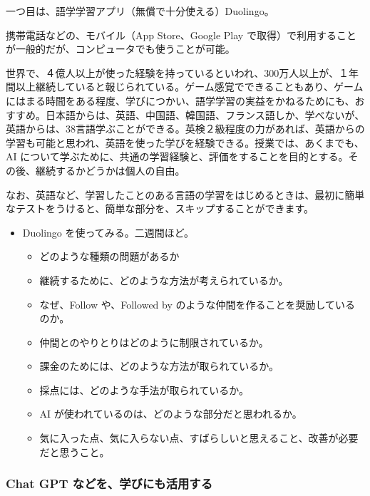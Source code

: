 \documentclass[
]{bxjsbook}
\providecommand{\tightlist}{%
  \setlength{\itemsep}{0pt}\setlength{\parskip}{0pt}}
\theoremstyle{definition}
\theoremstyle{definition}
\theoremstyle{definition}
\theoremstyle{definition}
\theoremstyle{remark}
\begin{document}
一つ目は、語学学習アプリ（無償で十分使える）Duolingo。

携帯電話などの、モバイル（App Store、Google Play で取得）で利用することが一般的だが、コンピュータでも使うことが可能。

世界で、４億人以上が使った経験を持っているといわれ、300万人以上が、１年間以上継続していると報じられている。ゲーム感覚でできることもあり、ゲームにはまる時間をある程度、学びにつかい、語学学習の実益をかねるためにも、おすすめ。日本語からは、英語、中国語、韓国語、フランス語しか、学べないが、英語からは、38言語学ぶことができる。英検２級程度の力があれば、英語からの学習も可能と思われ、英語を使った学びを経験できる。授業では、あくまでも、AI について学ぶために、共通の学習経験と、評価をすることを目的とする。その後、継続するかどうかは個人の自由。

なお、英語など、学習したことのある言語の学習をはじめるときは、最初に簡単なテストをうけると、簡単な部分を、スキップすることができます。

\begin{itemize}
\tightlist
\item
  Duolingo を使ってみる。二週間ほど。

  \begin{itemize}
  \tightlist
  \item
    どのような種類の問題があるか
  \item
    継続するために、どのような方法が考えられているか。
  \item
    なぜ、Follow や、Followed by のような仲間を作ることを奨励しているのか。
  \item
    仲間とのやりとりはどのように制限されているか。
  \item
    課金のためには、どのような方法が取られているか。
  \item
    採点には、どのような手法が取られているか。
  \item
    AI が使われているのは、どのような部分だと思われるか。
  \item
    気に入った点、気に入らない点、すばらしいと思えること、改善が必要だと思うこと。
  \end{itemize}
\end{itemize}

\hypertarget{chat-gpt-ux306aux3069ux3092ux5b66ux3073ux306bux3082ux6d3bux7528ux3059ux308b}{%
\subsubsection{Chat GPT などを、学びにも活用する}\label{chat-gpt-ux306aux3069ux3092ux5b66ux3073ux306bux3082ux6d3bux7528ux3059ux308b}}
\end{document}
